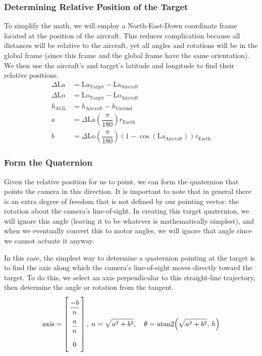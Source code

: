 \documentclass[letterpaper,10pt]{article}
\begin{document}
\subsubsection{Determining Relative Position of the Target}
To simplify the math, we will employ a North-East-Down coordinate frame located at the position of the aircraft. This reduces complication because all distances will be relative to the aircraft, yet all angles and rotations will be in the global frame (since this frame and the global frame have the same orientation). We then use the aircraft's and target's latitude and longitude to find their relative positions.
\begin{align}
\Delta\mathrm{La} &= \mathrm{La}_\text{Target} - \mathrm{La}_\text{Aircraft} \\
\Delta\mathrm{Lo} &= \mathrm{Lo}_\text{Target} - \mathrm{Lo}_\text{Aircraft} \\
h_\text{AGL} &= h_\text{Aircraft} - h_\text{Ground} \\
a &= \Delta\mathrm{La} \left(\dfrac{\pi}{180}\right) r_\text{Earth} \\
b &= \Delta\mathrm{Lo} \left(\dfrac{\pi}{180}\right) \left(1-\cos\!\left(\mathrm{La}_\text{Aircraft}\right)\right) r_\text{Earth}
\end{align}

\subsubsection{Form the Quaternion}
Given the relative position for us to point, we can form the quaternion that points the camera in this direction. It is important to note that in general there is an extra degree of freedom that is not defined by our pointing vector: the rotation about the camera's line-of-sight. In creating this target quaternion, we will ignore this angle (leaving it to be whatever is mathematically simplest), and when we eventually convert this to motor angles, we will ignore that angle since we cannot actuate it anyway.

In this case, the simplest way to determine a quaternion pointing at the target is to find the axis along which the camera's line-of-sight moves directly toward the target. To do this, we select an axis perpendicular to this straight-line trajectory, then determine the angle or rotation from the tangent.
\begin{equation*}
\text{axis} = \left[\arraycolsep=1.4pt\def\arraystretch{2.2}\begin{array}{c} \dfrac{-b}{n} \\ \dfrac{a}{n} \\ 0 \end{array}\right], \: n=\sqrt{a^2 + b^2}, \quad \theta = \mathrm{atan2}\!\left(\sqrt{a^2+b^2}, \,h\right)
\end{equation*}
\end{document}
